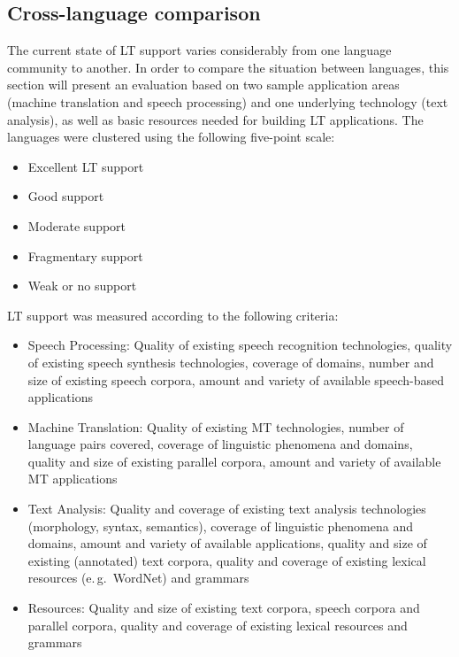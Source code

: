 \begin{multicols}{2}
 \subsection {Cross-language comparison}
   
The current state of LT support varies considerably from one language community to another. In order to compare the situation between languages, this section will present an evaluation based on two sample application areas (machine translation and speech processing) and one underlying technology (text analysis), as well as basic resources needed for building LT applications. 
The languages were clustered using the following five-point scale: 

    \begin{itemize}
      \item Excellent LT support
      \item Good support
      \item Moderate support
      \item Fragmentary support 
      \item Weak or no support
    \end{itemize}

LT support was measured according to the following criteria:
\begin{itemize}
\item Speech Processing: Quality of existing speech recognition technologies, quality of existing speech synthesis technologies, coverage of domains, number and size of existing speech corpora, amount and variety of available speech-based applications
\item Machine Translation: Quality of existing MT technologies, number of language pairs covered, coverage of linguistic phenomena and domains, quality and size of existing parallel corpora, amount and variety of available MT applications
\item Text Analysis: Quality and coverage of existing text analysis technologies (morphology, syntax, semantics), coverage of linguistic phenomena and domains, amount and variety of available applications, quality and size of existing (annotated) text corpora, quality and coverage of existing lexical resources (e.\,g.~WordNet) and grammars
\item Resources: Quality and size of existing text corpora, speech corpora and parallel corpora, quality and coverage of existing lexical resources and grammars
\end{itemize} 





\end{multicols}
